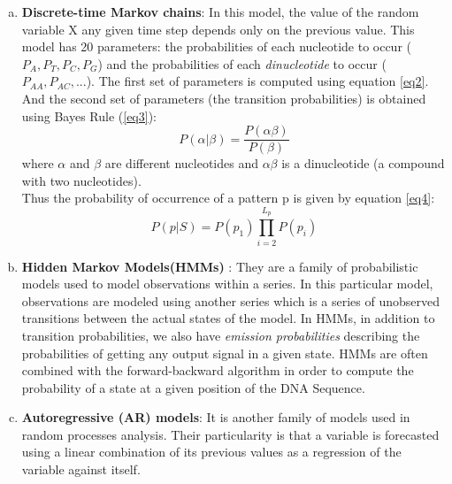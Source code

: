 \documentclass[10pt,twocolumn,letterpaper]{article}
\begin{document}
{\begin{itemize}
{\begin{enumerate}[i.]
\begin{enumerate}[a.]
               \item \textbf{Discrete-time Markov chains}: In this model, the value of the random variable X any given time step depends only on the previous value.
               This model has 20 parameters: the probabilities of each nucleotide to occur (\(P_A, P_T, P_C, P_G\)) and the probabilities of each \textit{dinucleotide} to occur (\(P_{AA}, P_{AC}, ...\)).
               The first set of parameters is computed using equation \ref{eq2}.
               And the second set of parameters (the transition probabilities) is obtained \cite{singh} using Bayes Rule (\ref{eq3}):\\
               \begin{equation}
                   P(\alpha|\beta) = \frac{P(\alpha \beta)}{P(\beta)}
                \label{eq3}
               \end{equation}
               where \(\alpha\) and \(\beta\) are different nucleotides and \(\alpha \beta \) is a dinucleotide (a compound with two nucleotides).\\ 
               Thus the probability of occurrence of a pattern p is given by equation \ref{eq4}:
               \begin{equation}
                   P(p|S) = P(p_1)\prod_{i=2}^{L_p} P(p_i)
                \label{eq4}
               \end{equation}
               \item \textbf{Hidden Markov Models(HMMs)} \cite{tommy}: They are a family of probabilistic models used to model observations within a series. In this particular model,
                observations are modeled using another series which is a series of unobserved transitions between the actual states of the model. In HMMs, in addition to transition probabilities, we also have 
               \textit{emission probabilities} describing the probabilities of getting any output signal in a given state.
               HMMs are often combined with the forward-backward \cite{forward_backward} algorithm in order to compute the probability of a state at a given position of the DNA Sequence.\\ 
               
               \item \textbf{Autoregressive (AR) models}\cite{chakravarthy2004autoregressive}: It is another family of models used in random processes analysis. Their particularity is that a variable is forecasted
               using a linear combination of its previous values as a regression of the variable against itself.
        \end{enumerate}
       \end{enumerate}
   }
    \end{itemize}
 }
\end{document}
